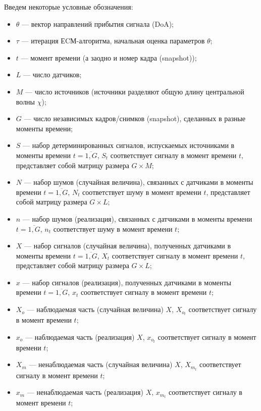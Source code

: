 \documentclass[11pt]{article}
\begin{document}
\begin{center}
\fontsize{20}{23}\selectfont {}
\end{center}
Введем некоторые условные обозначения:
\begin{itemize}
\item
$\theta$ --- вектор направлений прибытия сигнала (DoA);
\item
$\tau$ --- итерация ЕCМ-алгоритма, начальная оценка параметров $\theta$;
\item
$t$ --- момент времени (а заодно и номер кадра (snapshot));
\item
$L$ --- число датчиков;
\item
$M$ --- число источников (источники разделяют общую длину центральной волны $\chi$);
\item
$G$ --- число независимых кадров/снимков (snapshot), сделанных в разные моменты времени;
\item
$S$ --- набор детерминированных сигналов, испускаемых источниками в моменты времени $t=\overline{1,G}$, $S_t$ соответствует сигналу в момент времени $t$, представляет собой матрицу размера $G \times M$;
\item
$N$ --- набор шумов (случайная величина), связанных с датчиками в моменты времени $t=\overline{1,G}$, $N_t$ соответствует шуму в момент времени $t$, представляет собой матрицу размера $G \times L$;
\item
$n$ --- набор шумов (реализация), связанных с датчиками в моменты времени $t=\overline{1,G}$, $n_t$ соответствует шуму в момент времени $t$;
\item
$X$ --- набор сигналов (случайная величина), полученных датчиками в моменты времени $t=\overline{1,G}$, $X_t$ соответствует сигналу в момент времени $t$, представляет собой матрицу размера $G \times L$;
\item
$x$ --- набор сигналов (реализация), полученных датчиками в моменты времени $t=\overline{1,G}$, $x_t$ соответствует сигналу в момент времени $t$;
\item
$X_o$ --- наблюдаемая часть (случайная величина) $X$, $X_{o_t}$ соответствует сигналу в момент времени $t$; 
\item
$x_o$ --- наблюдаемая часть (реализация) $X$, $x_{o_t}$ соответствует сигналу в момент времени $t$;
\item
$X_m$ --- ненаблюдаемая часть (случайная величина) $X$, $X_{m_t}$ соответствует сигналу в момент времени $t$;
\item
$x_m$ --- ненаблюдаемая часть (реализация) $X$, $x_{m_t}$ соответствует сигналу в момент времени $t$;

\end{itemize}
\end{document}
